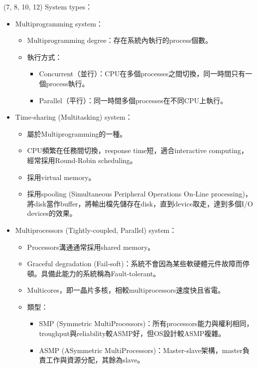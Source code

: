 \item \begin{theorem}{(7, 8, 10, 12)} System types：\begin{itemize}
        \item Multiprogramming system：\begin{itemize}
            \item Multiprogramming degree：存在系統內執行的process個數。
            \item 執行方式：\begin{itemize}
                \item Concurrent（並行）：CPU在多個processes之間切換，同一時間只有一個process執行。
                \item Parallel（平行）：同一時間多個processes在不同CPU上執行。
            \end{itemize}
        \end{itemize}
        \item Time-sharing (Multitasking) system：\begin{itemize}
            \item 屬於Multiprogramming的一種。
            \item CPU頻繁在任務間切換，response time短，適合interactive computing，經常採用Round-Robin scheduling。
            \item 採用virtual memory。
            \item 採用spooling (Simultaneous Peripheral Operations On-Line processing)，將disk當作buffer，將輸出檔先儲存在disk，直到device取走，達到多個I/O devices的效果。
        \end{itemize}
        \item Multiprocessors (Tightly-coupled, Parallel) system：\begin{itemize}
            \item Processors溝通通常採用shared memory。
            \item Graceful degradation (Fail-soft)：系統不會因為某些軟硬體元件故障而停頓。具備此能力的系統稱為Fault-tolerant。
            \item Multicores，即一晶片多核，相較multiprocessors速度快且省電。
            \item 類型：\begin{itemize}
                \item SMP (Symmetric MultiProcessors)：所有processors能力與權利相同，troughput與reliability較ASMP好，但OS設計較ASMP複雜。
                \item ASMP (ASymmetric MultiProcessors)：Master-slave架構，master負責工作與資源分配，其餘為slave。

\end{itemize}
\end{itemize}
\end{itemize}
\end{theorem}
